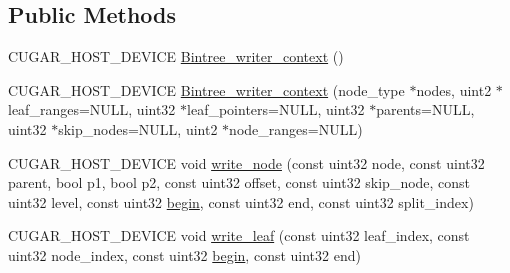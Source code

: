 \subsection*{Public Methods}
\begin{DoxyCompactItemize}
\item 
C\+U\+G\+A\+R\+\_\+\+H\+O\+S\+T\+\_\+\+D\+E\+V\+I\+CE \hyperlink{structcugar_1_1_bintree__writer__context_3_01node__type_00_01leaf__index__tag_01_4_aa3247197082ff28d6569e11d23a20e10}{Bintree\+\_\+writer\+\_\+context} ()
\item 
C\+U\+G\+A\+R\+\_\+\+H\+O\+S\+T\+\_\+\+D\+E\+V\+I\+CE \hyperlink{structcugar_1_1_bintree__writer__context_3_01node__type_00_01leaf__index__tag_01_4_a870153e9d1a38784b59764c0f6ef1d34}{Bintree\+\_\+writer\+\_\+context} (node\+\_\+type $\ast$nodes, uint2 $\ast$leaf\+\_\+ranges=N\+U\+LL, uint32 $\ast$leaf\+\_\+pointers=N\+U\+LL, uint32 $\ast$parents=N\+U\+LL, uint32 $\ast$skip\+\_\+nodes=N\+U\+LL, uint2 $\ast$node\+\_\+ranges=N\+U\+LL)
\item 
C\+U\+G\+A\+R\+\_\+\+H\+O\+S\+T\+\_\+\+D\+E\+V\+I\+CE void \hyperlink{structcugar_1_1_bintree__writer__context_3_01node__type_00_01leaf__index__tag_01_4_ae5bdeba11e0aaef878c80322b736bf24}{write\+\_\+node} (const uint32 node, const uint32 parent, bool p1, bool p2, const uint32 offset, const uint32 skip\+\_\+node, const uint32 level, const uint32 \hyperlink{namespacecugar_a2121df08f967e232ea5fe0ee378dee67}{begin}, const uint32 end, const uint32 split\+\_\+index)
\item 
C\+U\+G\+A\+R\+\_\+\+H\+O\+S\+T\+\_\+\+D\+E\+V\+I\+CE void \hyperlink{structcugar_1_1_bintree__writer__context_3_01node__type_00_01leaf__index__tag_01_4_a534db89404f2a3a0375daec339ca640f}{write\+\_\+leaf} (const uint32 leaf\+\_\+index, const uint32 node\+\_\+index, const uint32 \hyperlink{namespacecugar_a2121df08f967e232ea5fe0ee378dee67}{begin}, const uint32 end)
\end{DoxyCompactItemize}
